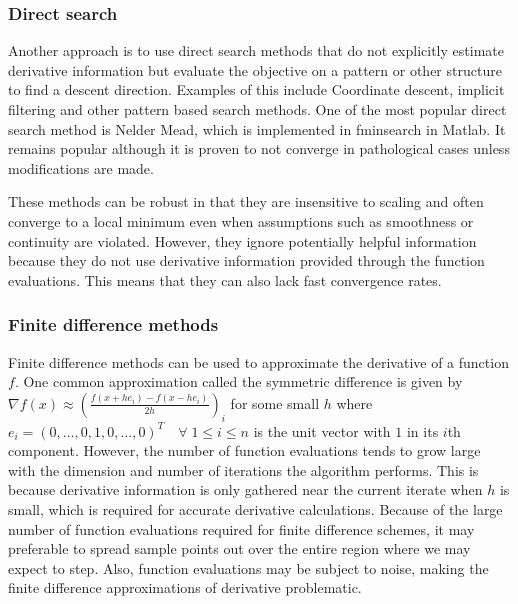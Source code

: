 \subsubsection{Direct search}


Another approach is to use direct search methods that do not explicitly estimate derivative information but evaluate the objective on a pattern or other structure to find a descent direction.
Examples of this include Coordinate descent, implicit filtering and other pattern based search methods.
One of the most popular direct search method is Nelder Mead, which is implemented in fminsearch in Matlab.
It remains popular although it is proven to not converge in pathological cases unless modifications are made.

These methods can be robust in that they are insensitive to scaling and often converge to a local minimum even when assumptions such as smoothness or continuity are violated.
However, they ignore potentially helpful information because they do not use derivative information provided through the function evaluations.
This means that they can also lack fast convergence rates.


\subsubsection{Finite difference methods}

Finite difference methods can be used to approximate the derivative of a function $f$.
One common approximation called the symmetric difference is given by $\nabla f(x) \approx (\frac{f(x+he_i) - f(x-he_i)}{2h})_i$ for some small $h$ where $e_i = (0,\ldots, 0, 1, 0, \ldots, 0)^T \quad \forall \; 1 \le i \le n$ is the unit vector with $1$ in its $i$th component.
However, the number of function evaluations tends to grow large with the dimension and number of iterations the algorithm performs.
This is because derivative information is only gathered near the current iterate when $h$ is small, which is required for accurate derivative calculations.
Because of the large number of function evaluations required for finite difference schemes, it may preferable to spread sample points out over the entire region where we may expect to step.
Also, function evaluations may be subject to noise, making the finite difference approximations of derivative problematic.

